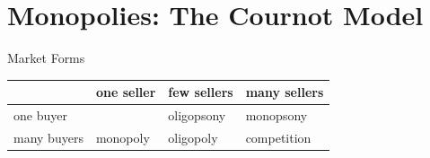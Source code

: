 
\section{Monopolies: The Cournot Model}



\begin{frame}{Market Forms}
 
        {
    \renewcommand{\arraystretch}{2}
        \begin{tabular}{l||l|l|l|}
                    &   one seller  & few sellers   & many sellers \\\hline\hline                
        one buyer   &               & oligopsony     & monopsony     \\\hline
        many buyers &   monopoly    & oligopoly     & competition \\\hline
        \end{tabular}
        }

\end{frame}


